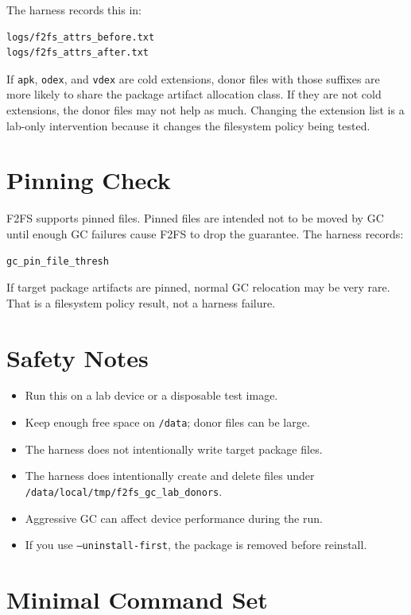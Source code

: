\documentclass[11pt]{article}
\begin{document}
The harness records this in:

\begin{verbatim}
logs/f2fs_attrs_before.txt
logs/f2fs_attrs_after.txt
\end{verbatim}

If \texttt{apk}, \texttt{odex}, and \texttt{vdex} are cold extensions, donor
files with those suffixes are more likely to share the package artifact
allocation class.  If they are not cold extensions, the donor files may not help
as much.  Changing the extension list is a lab-only intervention because it
changes the filesystem policy being tested.

\section{Pinning Check}

F2FS supports pinned files.  Pinned files are intended not to be moved by GC
until enough GC failures cause F2FS to drop the guarantee.  The harness records:

\begin{verbatim}
gc_pin_file_thresh
\end{verbatim}

If target package artifacts are pinned, normal GC relocation may be very rare.
That is a filesystem policy result, not a harness failure.

\section{Safety Notes}

\begin{itemize}
\item Run this on a lab device or a disposable test image.
\item Keep enough free space on \texttt{/data}; donor files can be large.
\item The harness does not intentionally write target package files.
\item The harness does intentionally create and delete files under
      \texttt{/data/local/tmp/f2fs\_gc\_lab\_donors}.
\item Aggressive GC can affect device performance during the run.
\item If you use \texttt{--uninstall-first}, the package is removed before
      reinstall.
\end{itemize}


\section{Minimal Command Set}
\end{document}
